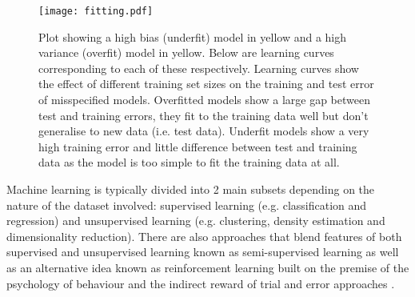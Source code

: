 \begin{figure}[h]
    \texttt{[image: fitting.pdf]}
    \caption{Plot showing a high bias (underfit) model in yellow and a high variance (overfit) model in yellow.
        Below are learning curves corresponding to each of these respectively.
        Learning curves show the effect of different training set sizes on the training and test error of misspecified models.
        Overfitted models show a large gap between test and training errors, they fit to the training data well but don't generalise
        to new data (i.e. test data).
        Underfit models show a very high training error and little difference between test and training data as the model is too simple
        to fit the training data at all.
    }
    \label{fig:fitting}
\end{figure}





Machine learning is typically divided into 2 main subsets depending on the nature of the dataset involved: 
supervised learning (e.g. classification and regression) and unsupervised learning (e.g. clustering,
density estimation and dimensionality reduction).
There are also approaches that blend features of both supervised and unsupervised learning known as semi-supervised
learning as well as an alternative idea known as reinforcement learning built on the premise of the psychology
of behaviour and the indirect reward of trial and error approaches \citep{Bishop2006}.



